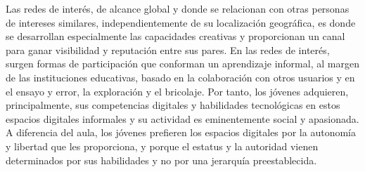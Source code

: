   Las redes de interés, de alcance global y donde se relacionan con otras personas de intereses similares, independientemente de su localización geográfica, es donde se desarrollan especialmente las capacidades creativas y proporcionan un canal para ganar visibilidad y reputación entre sus pares. 
 En las redes de interés, surgen formas de participación que conforman un aprendizaje informal, al margen de las instituciones educativas, basado en la colaboración con otros usuarios y en el ensayo y error, la exploración y el bricolaje.
 Por tanto, los jóvenes adquieren, principalmente, sus competencias digitales y habilidades tecnológicas en estos espacios digitales informales y su actividad es eminentemente social y apasionada. A diferencia del aula, los jóvenes prefieren los espacios digitales por la autonomía y libertad que les proporciona, y porque el estatus y la autoridad vienen determinados por sus habilidades y no por una jerarquía preestablecida.

